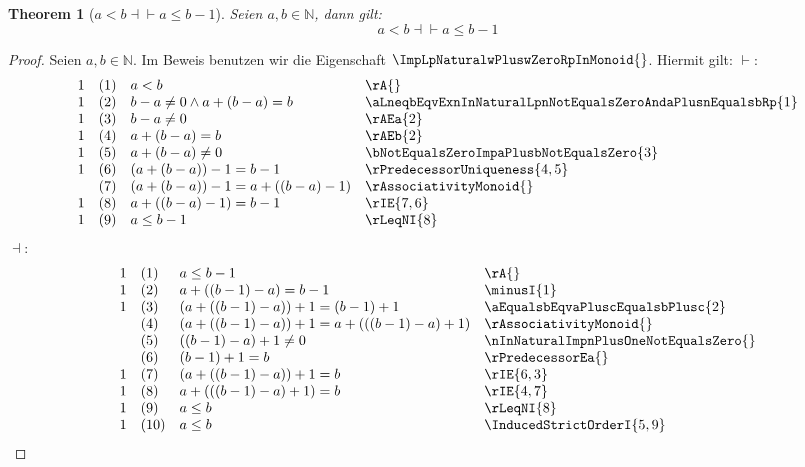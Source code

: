\documentclass{book}
\theoremstyle{plain}
\newtheorem{theorem}{Theorem}
\theoremstyle{remark}
\theoremstyle{definition}
\begin{document}
\label{aLneqbEqvaLeqbMinusOne}
\begin{theorem}[\(a<b\dashv\vdash a\leq b-1\)]
Seien \(a,b\in\mathbb{N}\), dann gilt:
\[a<b\dashv\vdash a\leq b-1\]
\end{theorem}
\begin{proof}
        Seien \(a,b\in\mathbb{N}\). Im Beweis benutzen wir die Eigenschaft \(\ImpLpNaturalwPluswZeroRpInMonoid{}\). Hiermit gilt:        
\(\vdash:\)
\[
\begin{array}{llll}
            1 & (1) & a<b  & \rA{} \\
            1 & (2) & b-a\neq 0\land a+(b-a)=b  & \aLneqbEqvExnInNaturalLpnNotEqualsZeroAndaPlusnEqualsbRp{1} \\
            1 & (3) & b-a\neq 0  & \rAEa{2} \\
            1 & (4) & a+(b-a)=b  & \rAEb{2} \\
            1 & (5) & a+(b-a)\neq 0  & \bNotEqualsZeroImpaPlusbNotEqualsZero{3} \\
            1 & (6) & (a+(b-a))-1=b-1  & \rPredecessorUniqueness{4,5} \\
              & (7) & (a+(b-a))-1=a+((b-a)-1)  & \rAssociativityMonoid{} \\
            1 & (8) & a+((b-a)-1)=b-1  & \rIE{7,6} \\
            1 & (9) & a\leq b-1  & \rLeqNI{8} \\
\end{array}
\]
\(\dashv:\)
\[
\begin{array}{llll}
            1 & (1) & a\leq b-1  & \rA{} \\
            1 & (2) & a+((b-1)-a)=b-1  & \minusI{1} \\
            1 & (3) & (a+((b-1)-a))+1=(b-1)+1  & \aEqualsbEqvaPluscEqualsbPlusc{2} \\
              & (4) & (a+((b-1)-a))+1=a+(((b-1)-a)+1)  & \rAssociativityMonoid{} \\
              & (5) & ((b-1)-a)+1\neq 0  & \nInNaturalImpnPlusOneNotEqualsZero{} \\
              & (6) & (b-1)+1=b  & \rPredecessorEa{} \\
            1 & (7) & (a+((b-1)-a))+1=b  & \rIE{6,3} \\
            1 & (8) & a+(((b-1)-a)+1)=b  & \rIE{4,7} \\
            1 & (9) & a\leq b  & \rLeqNI{8} \\
            1 & (10) & a\leq b  & \InducedStrictOrderI{5,9} \\
\end{array}
\]
\end{proof}
\end{document}
